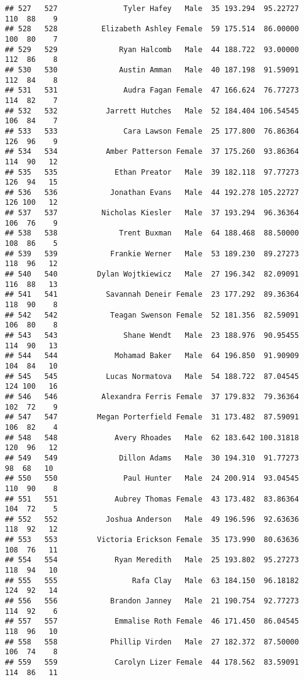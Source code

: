 \documentclass[
]{article}
\begin{document}
\begin{verbatim}
## 527   527               Tyler Hafey   Male  35 193.294  95.22727 110  88    9
## 528   528          Elizabeth Ashley Female  59 175.514  86.00000 100  80    7
## 529   529              Ryan Halcomb   Male  44 188.722  93.00000 112  86    8
## 530   530              Austin Amman   Male  40 187.198  91.59091 112  84    8
## 531   531               Audra Fagan Female  47 166.624  76.77273 114  82    7
## 532   532           Jarrett Hutches   Male  52 184.404 106.54545 106  84    7
## 533   533               Cara Lawson Female  25 177.800  76.86364 126  96    9
## 534   534           Amber Patterson Female  37 175.260  93.86364 114  90   12
## 535   535             Ethan Preator   Male  39 182.118  97.77273 126  94   15
## 536   536            Jonathan Evans   Male  44 192.278 105.22727 126 100   12
## 537   537          Nicholas Kiesler   Male  37 193.294  96.36364 106  76    9
## 538   538              Trent Buxman   Male  64 188.468  88.50000 108  86    5
## 539   539            Frankie Werner   Male  53 189.230  89.27273 118  96   12
## 540   540         Dylan Wojtkiewicz   Male  27 196.342  82.09091 116  88   13
## 541   541           Savannah Deneir Female  23 177.292  89.36364 118  90    8
## 542   542            Teagan Swenson Female  52 181.356  82.59091 106  80    8
## 543   543               Shane Wendt   Male  23 188.976  90.95455 114  90   13
## 544   544             Mohamad Baker   Male  64 196.850  91.90909 104  84   10
## 545   545           Lucas Normatova   Male  54 188.722  87.04545 124 100   16
## 546   546          Alexandra Ferris Female  37 179.832  79.36364 102  72    9
## 547   547         Megan Porterfield Female  31 173.482  87.59091 106  82    4
## 548   548             Avery Rhoades   Male  62 183.642 100.31818 120  96   12
## 549   549              Dillon Adams   Male  30 194.310  91.77273  98  68   10
## 550   550               Paul Hunter   Male  24 200.914  93.04545 110  90    8
## 551   551             Aubrey Thomas Female  43 173.482  83.86364 104  72    5
## 552   552           Joshua Anderson   Male  49 196.596  92.63636 118  92   12
## 553   553         Victoria Erickson Female  35 173.990  80.63636 108  76   11
## 554   554             Ryan Meredith   Male  25 193.802  95.27273 118  94   10
## 555   555                 Rafa Clay   Male  63 184.150  96.18182 124  92   14
## 556   556            Brandon Janney   Male  21 190.754  92.77273 114  92    6
## 557   557             Emmalise Roth Female  46 171.450  86.04545 118  96   10
## 558   558            Phillip Virden   Male  27 182.372  87.50000 106  74    8
## 559   559             Carolyn Lizer Female  44 178.562  83.59091 114  86   11

\end{verbatim}
\end{document}
